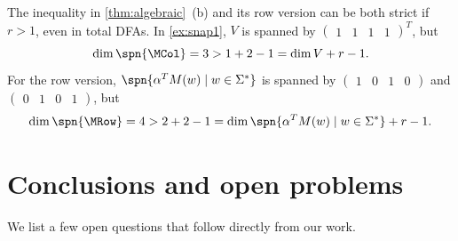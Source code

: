 \begin{rem}
The inequality in \autoref{thm:algebraic}~(b) and its row version can be both strict if $r>1$, even in total DFAs. In \autoref{ex:snap1}, $V$ is spanned by $\begin{pmatrix} 1 & 1 & 1 & 1\end{pmatrix}^T$, but 
\[\dim \spn{\MCol} = 3 > 1 + 2 - 1 = \dim V + r-1.\]
For the row version, $\spn{\alpha^T M(w) \mid w \in \Sigma^*}$ is spanned by 
$\begin{pmatrix}1 & 0 & 1 & 0\end{pmatrix}$ and
$\begin{pmatrix}0 & 1 & 0 & 1\end{pmatrix}$, but 
\[\dim \spn{\MRow} = 4 > 2 + 2 - 1 = \dim \spn{\alpha^T M(w) \mid w \in \Sigma^*} + r - 1.\]
\end{rem}

\section{Conclusions and open problems}\label{sec-conclusions}
We list a few open questions that follow directly from our work.

